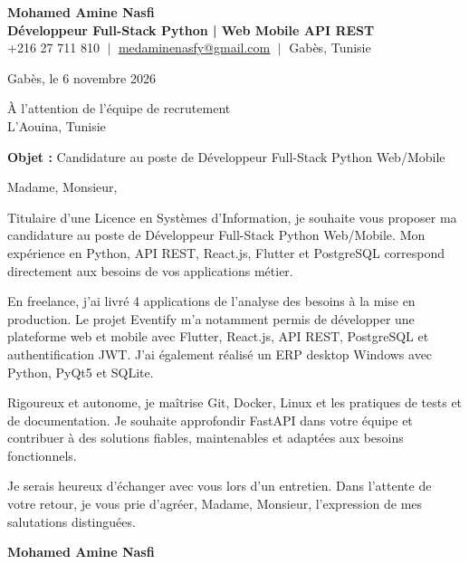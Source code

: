 \documentclass[11pt,a4paper]{article}
\begin{document}
\begin{center}
    \textbf{\Huge \color{navy} Mohamed Amine Nasfi} \\[3pt]
    \small \textbf{\color{accent} Développeur Full-Stack Python | Web \textperiodcentered{} Mobile \textperiodcentered{} API REST} \\[3pt]
    \footnotesize \color{greytext}
    +216 27 711 810 $\;|\;$
    \href{mailto:medaminenasfy@gmail.com}{\underline{medaminenasfy@gmail.com}} $\;|\;$
    Gabès, Tunisie
\end{center}

\vspace{8pt}
\hfill Gabès, le 6 novembre 2026

\vspace{12pt}
À l'attention de l'équipe de recrutement \\ L'Aouina, Tunisie

\vspace{10pt}
\textbf{Objet :} Candidature au poste de Développeur Full-Stack Python Web/Mobile

\vspace{4pt}
Madame, Monsieur,

Titulaire d'une Licence en Systèmes d'Information, je souhaite vous proposer ma candidature au poste de Développeur Full-Stack Python Web/Mobile. Mon expérience en Python, API REST, React.js, Flutter et PostgreSQL correspond directement aux besoins de vos applications métier.

En freelance, j'ai livré 4 applications de l'analyse des besoins à la mise en production. Le projet Eventify m'a notamment permis de développer une plateforme web et mobile avec Flutter, React.js, API REST, PostgreSQL et authentification JWT. J'ai également réalisé un ERP desktop Windows avec Python, PyQt5 et SQLite.

Rigoureux et autonome, je maîtrise Git, Docker, Linux et les pratiques de tests et de documentation. Je souhaite approfondir FastAPI dans votre équipe et contribuer à des solutions fiables, maintenables et adaptées aux besoins fonctionnels.

Je serais heureux d'échanger avec vous lors d'un entretien. Dans l'attente de votre retour, je vous prie d'agréer, Madame, Monsieur, l'expression de mes salutations distinguées.



\vspace{14pt}
\hfill \textbf{Mohamed Amine Nasfi}
\end{document}
